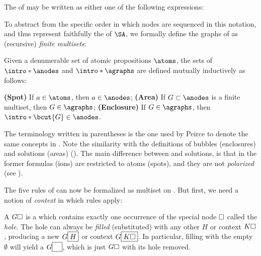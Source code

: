 \begin{example}
The  of  may be written as either one of the
following expressions:
\end{example}

To abstract from the specific order in which nodes are sequenced in this
notation, and thus represent faithfully the  of $\SA$, we formally
define the graphs of  as (recursive) \emph{finite multisets}:

\begin{scope}

\begin{definition}[Graph] 
  
  Given a denumerable set of atomic propositions $\atoms$, the sets of
   $\intro*\anodes$ and 
  $\intro*\agraphs$ are defined mutually inductively as follows:
  \begin{itemize}
    \itemAP \textbf{(Spot)} If $a \in \atoms$, then $a \in \anodes$;
    \itemAP \textbf{(Area)} If $G \subset \anodes$ is a finite multiset, then $G
    \in \agraphs$;
    \itemAP \textbf{(Enclosure)} If $G \in \agraphs$, then $\intro*\bcut{G} \in
    \anodes$.
  \end{itemize}
\end{definition}
The terminology written in parentheses is the one used by Peirce to denote the
same concepts in . Note the similarity with
the definitions of bubbles (enclosures) and solutions (areas)
(). The main difference between  and solutions,
is that in the former formulas (ions) are restricted to atoms (spots), and they
are not \emph{polarized} (see ).

The five rules of  can now be formalized as multiset 
on . But first, we need a notion of \emph{context} in which rules
apply:

\begin{definition}[Context]
  A  $G\square$ is a  which contains exactly one
  occurrence of the special node $\square$ called the \emph{hole}. The hole can
  always be \emph{filled} (substituted) with any other  $H$ or context
  $K\square$, producing a new  $G\fbox{$H$}$ or context $G\fbox{$K\square$}$.
  In particular, filling with the empty  $\emptyset$ will yield a 
  $G\fbox{$\phantom{G}$}$, which is just $G\square$ with its hole removed.
\end{definition}


\end{scope}
